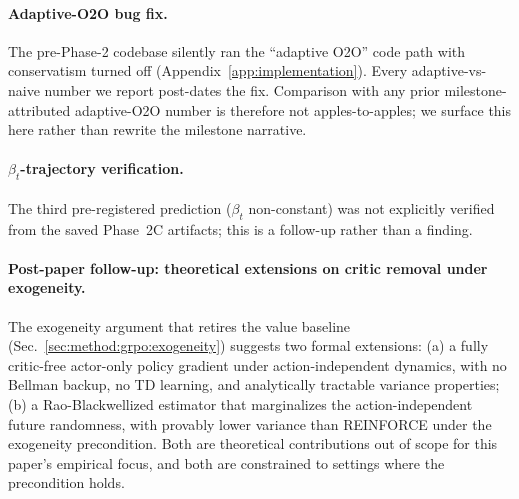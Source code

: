 \paragraph{Adaptive-O2O bug fix.} The pre-Phase-2 codebase silently
ran the ``adaptive O2O'' code path with conservatism turned off
(Appendix~\ref{app:implementation}). Every adaptive-vs-naive number we
report post-dates the fix. Comparison with any prior milestone-attributed
adaptive-O2O number is therefore not apples-to-apples; we surface this
here rather than rewrite the milestone narrative.

\paragraph{$\beta_t$-trajectory verification.} The third
pre-registered prediction ($\beta_t$ non-constant) was not explicitly
verified from the saved Phase~2C artifacts; this is a follow-up
rather than a finding.

\paragraph{Post-paper follow-up: theoretical extensions on critic
removal under exogeneity.} The exogeneity argument that retires the
value baseline (Sec.~\ref{sec:method:grpo:exogeneity}) suggests two
formal extensions: (a) a fully critic-free actor-only policy gradient
under action-independent dynamics, with no Bellman backup, no TD
learning, and analytically tractable variance properties; (b) a
Rao-Blackwellized estimator that marginalizes the action-independent
future randomness, with provably lower variance than REINFORCE under
the exogeneity precondition. Both are theoretical contributions out of
scope for this paper's empirical focus, and both are constrained to
settings where the precondition holds.
